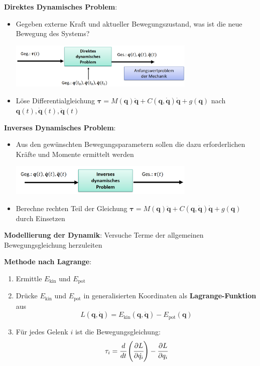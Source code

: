 \bigskip
\textbf{Direktes Dynamisches Problem}:  
\begin{itemize}
	\item Gegeben externe Kraft und aktueller Bewegungszustand, was ist die neue Bewegung des Systems?
	\begin{center}
		\includegraphics[width=0.7\textwidth]{images/dir-dyn.png}
	\end{center}
	\item Löse Differentialgleichung $\boldsymbol{\tau}=M(\mathbf{q})\mathbf{\ddot{q}}+C(\mathbf{q},\mathbf{\dot{q}})\mathbf{\dot{q}}+g(\mathbf{q})$ nach $\mathbf{q}(t),\mathbf{\dot{q}}(t),\mathbf{\ddot{q}}(t)$
\end{itemize}
\bigskip
\textbf{Inverses Dynamisches Problem}:
\begin{itemize}
	\item Aus den gewünschten Bewegungsparametern sollen die dazu erforderlichen Kräfte und Momente ermittelt werden
	\begin{center}
		\includegraphics[width=0.7\textwidth]{images/ind-dyn.png}
	\end{center}
	\item Berechne rechten Teil der Gleichung $\boldsymbol{\tau}=M(\mathbf{q})\mathbf{\ddot{q}}+C(\mathbf{q},\mathbf{\dot{q}})\mathbf{\dot{q}}+g(\mathbf{q})$ durch Einsetzen
\end{itemize}
\bigskip
\textbf{Modellierung der Dynamik}: Versuche Terme der allgemeinen Bewegungsgleichung herzuleiten

\textbf{Methode nach Lagrange}:
\begin{enumerate}
	\item Ermittle $E_\text{kin}$ und $E_\text{pot}$
	\item Drücke $E_\text{kin}$ und $E_\text{pot}$ in generalisierten Koordinaten als \textbf{Lagrange-Funktion} aus $$L(\mathbf{q},\mathbf{\dot{q}})=E_\text{kin}(\mathbf{q},\mathbf{\dot{q}})-E_\text{pot}(\mathbf{q})$$
	\item Für jedes Gelenk $i$ ist die Bewegungsgleichung: $$\tau_i=\cfrac{d}{dt}\left(\cfrac{\partial L}{\partial \dot{q_i}}\right)-\cfrac{\partial L}{\partial q_i}$$
\end{enumerate}

